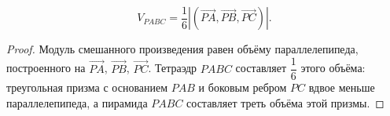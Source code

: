 \documentclass[12pt]{article}
\begin{document}
    \begin{statement}
    	\[
    		V_{PABC} = \dfrac{1}{6} \left| (\vec{PA}, \vec{PB}, \vec{PC}) \right|.
    	\]
    \end{statement}
    
    \begin{proof}
    	Модуль смешанного произведения равен объёму параллелепипеда, построенного на $\vec{PA}$, $\vec{PB}$, $\vec{PC}$. Тетраэдр $PABC$ составляет $\dfrac{1}{6}$ этого объёма: треугольная призма с основанием $PAB$ и боковым ребром $PC$ вдвое меньше параллелепипеда, а пирамида $PABC$ составляет треть объёма этой призмы.
    \end{proof}
	
\end{document}
